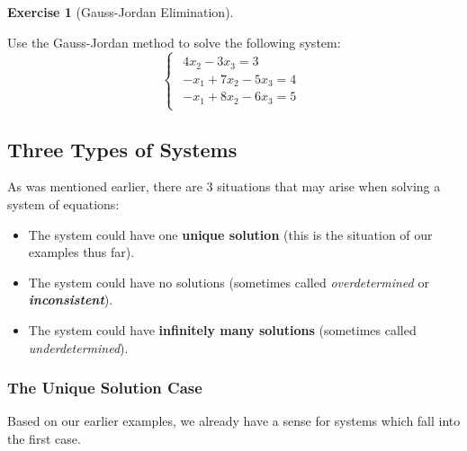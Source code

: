 \documentclass[
]{article}
\providecommand{\tightlist}{%
  \setlength{\itemsep}{0pt}\setlength{\parskip}{0pt}}
\theoremstyle{definition}
\theoremstyle{definition}
\theoremstyle{definition}
\newtheorem{exercise}{Exercise}[section]
\theoremstyle{definition}
\theoremstyle{remark}
\begin{document}
\begin{exercise}[Gauss-Jordan Elimination]
\protect\hypertarget{exr:gaussjordanexer}{}\label{exr:gaussjordanexer}

Use the Gauss-Jordan method to solve the following system:
\[\begin{cases}\begin{align}
4x_2-3x_3=3\\
-x_1+7x_2-5x_3=4\\
-x_1+8x_2-6x_3=5\end{align}\end{cases}\]

\end{exercise}

\hypertarget{three-types-of-systems}{%
\subsection{Three Types of Systems}\label{three-types-of-systems}}

As was mentioned earlier, there are 3 situations that may arise when solving a system of equations:

\begin{itemize}
\tightlist
\item
  The system could have one \textbf{unique solution} (this is the situation of our examples thus far).
\item
  The system could have no solutions (sometimes called \emph{overdetermined} or \textbf{\emph{inconsistent}}).
\item
  The system could have \textbf{infinitely many solutions} (sometimes called \emph{underdetermined}).
\end{itemize}

\hypertarget{uniquesol}{%
\subsubsection{The Unique Solution Case}\label{uniquesol}}

Based on our earlier examples, we already have a sense for systems which fall into the first case.
\end{document}
